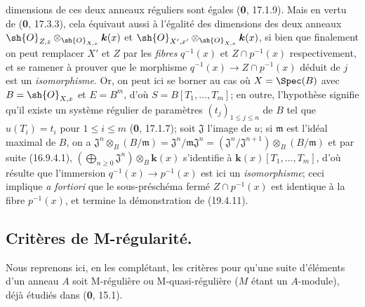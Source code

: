 dimensions de ces deux anneaux réguliers sont égales (\textbf{0}, 17.1.9). Mais en vertu de (\textbf{0}, 17.3.3), cela équivaut aussi à l'égalité des dimensions des deux anneaux $\sh{O}_{Z,z}\otimes_{\sh{O}_{X,x}}\boldsymbol{k}(x)$ et $\sh{O}_{X',x'}\otimes_{\sh{O}_{X,x}}\boldsymbol{k}(x)$, si bien que finalement on peut remplacer $X'$ et $Z$ par les \emph{fibres} $q^{-1}(x)$ et $Z\cap p^{-1}(x)$ respectivement, et se ramener à prouver que le morphisme $q^{-1}(x)\to Z\cap p^{-1}(x)$ déduit de $j$ est un \emph{isomorphisme}. Or, on peut ici se borner au cas où $X=\Spec(B)$ avec $B=\sh{O}_{X,x}$ et $E=B^m$, d'où $S=B[T_1,\ldots,T_m]$; en outre, l'hypothèse signifie qu'il existe un système régulier de paramètres $(t_j)_{1\leq j\leq n}$ de $B$ tel que $u(T_i)=t_i$ pour $1\leq i\leq m$ (\textbf{0}, 17.1.7); soit $\mathfrak J$ l'image de $u$; si $\mathfrak m$ est l'idéal maximal de $B$, on a $\mathfrak J^n\otimes_B(B/\mathfrak m)=\mathfrak J^n/\mathfrak m\mathfrak J^n=(\mathfrak J^n/\mathfrak J^{n+1})\otimes_B(B/\mathfrak m)$ et par suite (16.9.4.1), $(\bigoplus_{n\geq0}\mathfrak J^n)\otimes_B\boldsymbol{k}(x)$ s'identifie à $\boldsymbol{k}(x)[T_1,\ldots,T_m]$, d'où résulte que l'immersion $q^{-1}(x)\to p^{-1}(x)$ est ici un \emph{isomorphisme}; ceci implique \emph{a fortiori} que le sous-préschéma fermé $Z\cap p^{-1}(x)$ est identique à la fibre $p^{-1}(x)$, et termine la démonstration de (19.4.11).

\subsection{Critères de M-régularité.}

Nous reprenons ici, en les complétant, les critères pour qu'une suite d'éléments d'un anneau $A$ soit M-régulière ou M-quasi-régulière ($M$ étant un $A$-module), déjà étudiés dans (\textbf{0}, 15.1).


